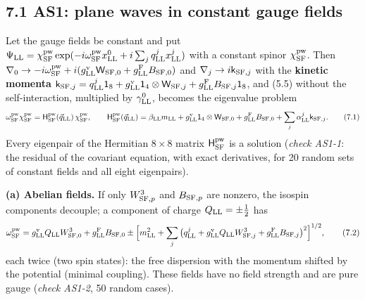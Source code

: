 \documentclass[
  10pt,
]{article}
\begin{document}
\hypertarget{as1-plane-waves-in-constant-gauge-fields}{%
\subsection{7.1 AS1: plane waves in constant gauge
fields}\label{as1-plane-waves-in-constant-gauge-fields}}

Let the gauge fields be constant and put
\(\Psi_{\rm LL}=\chi^{\rm pw}_{\rm SF}\exp(-i\omega^{\rm pw}_{\rm SF}x^0_{\rm LL}+i\sum_jq^j_{\rm LL}x^j_{\rm LL})\)
with a constant spinor \(\chi^{\rm pw}_{\rm SF}\). Then
\(\nabla_0\to-i\omega^{\rm pw}_{\rm SF}+i(g^{\rm v}_{\rm LL}\mathsf W_{{\rm SF},0}+g^{\rm F}_{\rm LL}B_{{\rm SF},0})\)
and \(\nabla_j\to i\mathsf k_{{\rm SF},j}\) with the \textbf{kinetic
momenta}
\(\mathsf k_{{\rm SF},j}=q^j_{\rm LL}\mathsf 1_8+g^{\rm v}_{\rm LL}\mathsf 1_4\otimes\mathsf W_{{\rm SF},j}+g^{\rm F}_{\rm LL}B_{{\rm SF},j}\mathsf 1_8\),
and (5.5) without the self-interaction, multiplied by
\(\gamma^0_{\rm LL}\), becomes the eigenvalue problem
\[\omega^{\rm pw}_{\rm SF}\chi^{\rm pw}_{\rm SF}=\mathsf H^{\rm pw}_{\rm SF}(\vec q_{\rm LL})\,\chi^{\rm pw}_{\rm SF},\qquad\mathsf H^{\rm pw}_{\rm SF}(\vec q_{\rm LL})=\beta_{\rm LL}m_{\rm LL}+g^{\rm v}_{\rm LL}\mathsf 1_4\otimes\mathsf W_{{\rm SF},0}+g^{\rm F}_{\rm LL}B_{{\rm SF},0}+\sum_j\alpha^j_{\rm LL}\mathsf k_{{\rm SF},j}.\tag{7.1}\]
Every eigenpair of the Hermitian \(8\times8\) matrix
\(\mathsf H^{\rm pw}_{\rm SF}\) is a solution (\emph{check AS1-1}: the
residual of the covariant equation, with exact derivatives, for 20
random sets of constant fields and all eight eigenpairs).

\textbf{(a) Abelian fields.} If only \(W^3_{{\rm SF},p}\) and
\(B_{{\rm SF},p}\) are nonzero, the isospin components decouple; a
component of charge \(Q_{\rm LL}=\pm\tfrac12\) has
\[\omega^{\rm pw}_{\rm SF}=g^{\rm v}_{\rm LL}Q_{\rm LL}W^3_{{\rm SF},0}+g^{\rm F}_{\rm LL}B_{{\rm SF},0}\pm\Big[m_{\rm LL}^2+\sum_j\big(q^j_{\rm LL}+g^{\rm v}_{\rm LL}Q_{\rm LL}W^3_{{\rm SF},j}+g^{\rm F}_{\rm LL}B_{{\rm SF},j}\big)^2\Big]^{1/2},\tag{7.2}\]
each twice (two spin states): the free dispersion with the momentum
shifted by the potential (minimal coupling). These fields have no field
strength and are pure gauge (\emph{check AS1-2}, 50 random cases).
\end{document}
